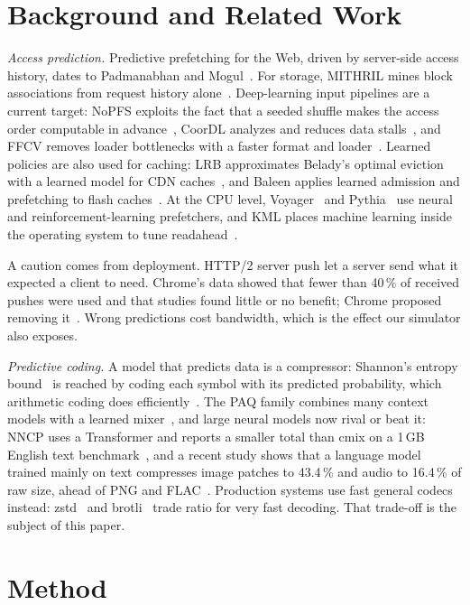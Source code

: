 \documentclass[conference]{IEEEtran}
\begin{document}
\section{Background and Related Work}\label{sec:related}
\emph{Access prediction.} Predictive prefetching for the Web, driven by server-side access history, dates to Padmanabhan and Mogul~\cite{padmanabhan1996}. For storage, MITHRIL mines block associations from request history alone~\cite{yang2017mithril}. Deep-learning input pipelines are a current target: NoPFS exploits the fact that a seeded shuffle makes the access order computable in advance~\cite{dryden2021nopfs}, CoorDL analyzes and reduces data stalls~\cite{mohan2021datastalls}, and FFCV removes loader bottlenecks with a faster format and loader~\cite{leclerc2023ffcv}. Learned policies are also used for caching: LRB approximates Belady's optimal eviction with a learned model for CDN caches~\cite{song2020lrb}, and Baleen applies learned admission and prefetching to flash caches~\cite{wong2024baleen}. At the CPU level, Voyager~\cite{shi2021voyager} and Pythia~\cite{bera2021pythia} use neural and reinforcement-learning prefetchers, and KML places machine learning inside the operating system to tune readahead~\cite{akgun2021kml}.

A caution comes from deployment. HTTP/2 server push let a server send what it expected a client to need. Chrome's data showed that fewer than 40\,\% of received pushes were used and that studies found little or no benefit; Chrome proposed removing it~\cite{chromium_push}. Wrong predictions cost bandwidth, which is the effect our simulator also exposes.

\emph{Predictive coding.} A model that predicts data is a compressor: Shannon's entropy bound~\cite{shannon1948} is reached by coding each symbol with its predicted probability, which arithmetic coding does efficiently~\cite{witten1987}. The PAQ family combines many context models with a learned mixer~\cite{mahoney2005}, and large neural models now rival or beat it: NNCP uses a Transformer and reports a smaller total than cmix on a 1\,GB English text benchmark~\cite{bellard_nncp}, and a recent study shows that a language model trained mainly on text compresses image patches to 43.4\,\% and audio to 16.4\,\% of raw size, ahead of PNG and FLAC~\cite{deletang2023}. Production systems use fast general codecs instead: zstd~\cite{rfc8878} and brotli~\cite{rfc7932} trade ratio for very fast decoding. That trade-off is the subject of this paper.

\section{Method}\label{sec:method}
\end{document}

